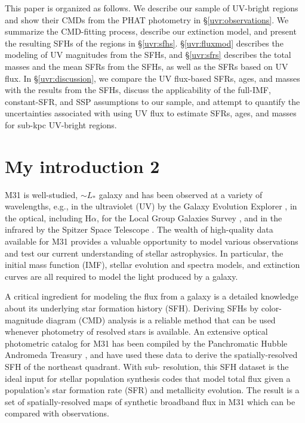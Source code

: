 This paper is organized as follows. We describe our sample of UV-bright regions
and show their CMDs from the PHAT photometry in \S \ref{uvr:observations}. We
summarize the CMD-fitting process, describe our extinction model, and present
the resulting SFHs of the regions in \S \ref{uvr:sfhs}. \S \ref{uvr:fluxmod} describes
the modeling of UV magnitudes from the SFHs, and \S \ref{uvr:sfrs} describes the
total masses and the mean SFRs from the SFHs, as well as the SFRs based on UV
flux. In \S \ref{uvr:discussion}, we compare the UV flux-based SFRs, ages, and
masses with the results from the SFHs, discuss the applicability of the
full-IMF, constant-SFR, and SSP assumptions to our sample, and attempt to
quantify the uncertainties associated with using UV flux to estimate SFRs,
ages, and masses for sub-kpc UV-bright regions.




\section{My introduction 2}

M31 is well-studied, $\sim L_\ast$ galaxy and has been observed at a variety of
wavelengths, e.g., in the ultraviolet (UV) by the Galaxy Evolution Explorer
\citep[GALEX;][]{Morrissey:2007}, in the optical, including H$\alpha$, for the
Local Group Galaxies Survey \citep{Massey:2006}, and in the infrared by the
Spitzer Space Telescope \citep{Gordon:2006}. The wealth of high-quality data
available for M31 provides a valuable opportunity to model various observations
and test our current understanding of stellar astrophysics. In particular, the
initial mass function (IMF), stellar evolution and spectra models, and
extinction curves are all required to model the light produced by a galaxy.

A critical ingredient for modeling the flux from a galaxy is a detailed
knowledge about its underlying star formation history (SFH). Deriving SFHs by
color-magnitude diagram (CMD) analysis is a reliable method that can be used
whenever photometry of resolved stars is available. An extensive optical
photometric catalog for M31 has been compiled by the Panchromatic Hubble
Andromeda Treasury \citep[PHAT][]{Dalcanton:2012}, and \citet{Lewis:2014} have
used these data to derive the spatially-resolved SFH of the northeast quadrant.
With sub-\kpc{} resolution, this SFH dataset is the ideal input for stellar
population synthesis codes that model total flux given a population's star
formation rate (SFR) and metallicity evolution. The result is a set of
spatially-resolved maps of synthetic broadband flux in M31 which can be
compared with observations.

